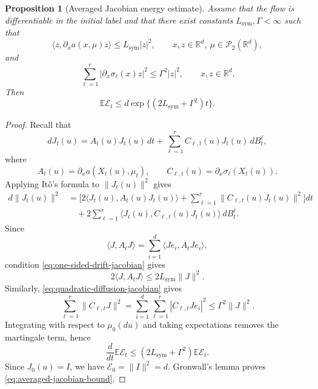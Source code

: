 \documentclass{tsp-short}
\newtheorem{proposition}{Proposition}[section]
\theoremstyle{remark}
\theoremstyle{definition}
\newcommand{\R}{\mathbb{R}} %
\newcommand{\cP}{\mathcal{P}} %
\newcommand{\E}{\mathbb E} %
\begin{document}
\begin{proposition}[Averaged Jacobian energy estimate]\label{prop:averaged-jacobian-energy}
	Assume that the flow is differentiable in the initial label and that there
	exist constants \(L_{\mathrm{sym}},\Gamma<\infty\) such that
	\begin{equation}\label{eq:one-sided-drift-jacobian}
		\langle z,\partial_x a(x,\mu)z\rangle \le L_{\mathrm{sym}}|z|^2, \qquad x,z\in\R^d,\ \mu\in\cP_2(\R^d),
	\end{equation}
	and
	\begin{equation}\label{eq:quadratic-diffusion-jacobian}
		\sum_{\ell=1}^{r}|\partial_x\sigma_\ell(x)z|^2 \le \Gamma^2|z|^2, \qquad x,z\in\R^d.
	\end{equation}
	Then
	\begin{equation}\label{eq:averaged-jacobian-bound}
		\E\mathcal E_t \le d\exp\{(2L_{\mathrm{sym}}+\Gamma^2)t\}.
	\end{equation}
\end{proposition}

\begin{proof}
	Recall that
	\begin{equation*}
		dJ_t(u) = A_t(u)J_t(u)\,dt + \sum_{\ell=1}^{r} C_{\ell,t}(u)J_t(u)\,dB_t^\ell,
	\end{equation*}
	where
	\begin{equation*}
		A_t(u)=\partial_x a(X_t(u),\mu_t), \qquad C_{\ell,t}(u)=\partial_x\sigma_\ell(X_t(u)).
	\end{equation*}
	Applying It\^o's formula to \(\|J_t(u)\|^2\) gives
	\begin{align*}
		d\|J_t(u)\|^2 & = \bigg[2\langle J_t(u),A_t(u)J_t(u)\rangle + \sum_{\ell=1}^{r}\|C_{\ell,t}(u)J_t(u)\|^2 \bigg]dt \\
		              & \quad + 2\sum_{\ell=1}^{r} \langle J_t(u),C_{\ell,t}(u)J_t(u)\rangle\,dB_t^\ell.
	\end{align*}
	Since
	\begin{equation*}
		\langle J,A_tJ\rangle = \sum_{i=1}^d\langle Je_i,A_tJe_i\rangle,
	\end{equation*}
	condition \eqref{eq:one-sided-drift-jacobian} gives
	\begin{equation*}
		2\langle J,A_tJ\rangle \le 2L_{\mathrm{sym}}\|J\|^2.
	\end{equation*}
	Similarly, \eqref{eq:quadratic-diffusion-jacobian} gives
	\begin{equation*}
		\sum_{\ell=1}^{r}\|C_{\ell,t}J\|^2 = \sum_{i=1}^d\sum_{\ell=1}^{r}|C_{\ell,t}Je_i|^2 \le \Gamma^2\|J\|^2.
	\end{equation*}
	Integrating with respect to \(\mu_0(du)\) and taking expectations removes the
	martingale term, hence
	\begin{equation*}
		\frac{d}{dt}\E\mathcal E_t \le (2L_{\mathrm{sym}}+\Gamma^2)\E\mathcal E_t.
	\end{equation*}
	Since \(J_0(u)=I\), we have \(\mathcal E_0=\|I\|^2=d\). Gronwall's
	lemma proves \eqref{eq:averaged-jacobian-bound}.
\end{proof}
\end{document}
